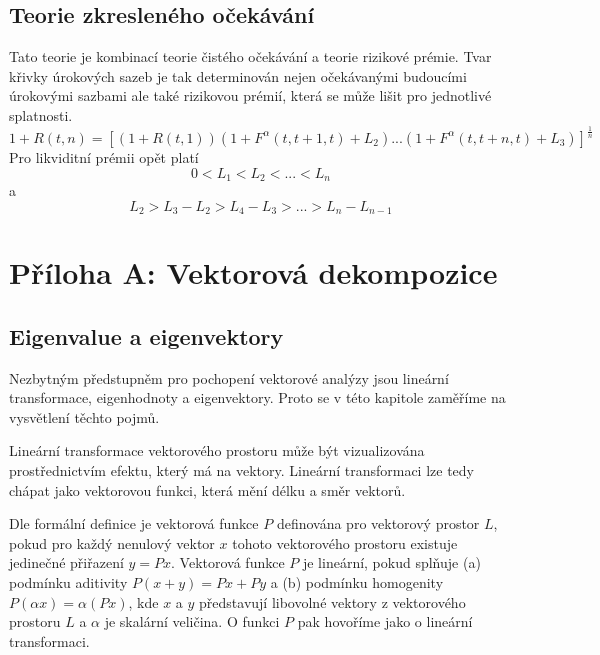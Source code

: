 \documentclass[a4paper]{book}
\begin{document}
\subsection{Teorie zkresleného očekávání}

Tato teorie je kombinací teorie čistého očekávání a teorie rizikové prémie. Tvar křivky úrokových sazeb je tak determinován nejen očekávanými budoucími úrokovými sazbami ale také rizikovou prémií, která se může lišit pro jednotlivé splatnosti.
\begin{equation*}
1 + R(t, n) = [(1 + R(t,1))(1 + F^{\alpha}(t, t+1,t) + L_2)  ... (1 + F^{\alpha}(t, t+n,t) + L_3)]^{\frac{1}{n}}
\end{equation*}
Pro likviditní prémii opět platí
\begin{equation*}
0 < L_1 < L_2 < ... < L_n
\end{equation*}
a
\begin{equation*}
L_2 > L_3 - L_2 > L_4 - L_3 > ... > L_n - L_{n-1}
\end{equation*}

\section{Příloha A: Vektorová dekompozice}

\subsection{Eigenvalue a eigenvektory}

Nezbytným předstupněm pro pochopení vektorové analýzy jsou lineární transformace, eigenhodnoty a eigenvektory. Proto se v této kapitole zaměříme na vysvětlení těchto pojmů.

Lineární transformace vektorového prostoru může být vizualizována prostřednictvím efektu, který má na vektory. Lineární transformaci lze tedy chápat jako vektorovou funkci, která mění délku a směr vektorů.

Dle formální definice je vektorová funkce $P$ definována pro vektorový prostor $L$, pokud pro každý nenulový vektor $x$ tohoto vektorového prostoru existuje jedinečné přiřazení $y = Px$. Vektorová funkce $P$ je lineární, pokud splňuje (a) podmínku aditivity $P(x + y) = Px + Py$ a (b) podmínku homogenity $P(\alpha x) = \alpha (Px)$, kde $x$ a $y$ představují libovolné vektory z vektorového prostoru $L$ a $\alpha $ je skalární veličina. O funkci $P$ pak hovoříme jako o lineární transformaci.
\end{document}

